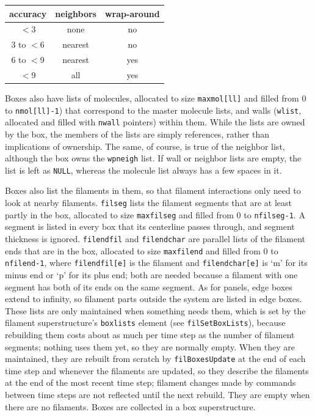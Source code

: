 \documentclass {scrbook}
\newcommand {\ttt} {\texttt}
\begin{document}
\begin{longtable}[c]{ccc}
accuracy&neighbors&wrap-around\\
\hline
$<$3&none&no\\
3 to $<$6&nearest&no\\
6 to $<$9&nearest&yes\\
$<$9&all&yes\\
\end{longtable}

Boxes also have lists of molecules, allocated to size \ttt{maxmol[ll]} and filled from 0 to \ttt{nmol[ll]-1}) that correspond to the master molecule lists, and walls (\ttt{wlist}, allocated and filled with \ttt{nwall} pointers) within them. While the lists are owned by the box, the members of the lists are simply references, rather than implications of ownership. The same, of course, is true of the neighbor list, although the box owns the \ttt{wpneigh} list. If wall or neighbor lists are empty, the list is left as \ttt{NULL}, whereas the molecule list always has a few spaces in it.

Boxes also list the filaments in them, so that filament interactions only need to look at nearby filaments. \ttt{filseg} lists the filament segments that are at least partly in the box, allocated to size \ttt{maxfilseg} and filled from 0 to \ttt{nfilseg-1}. A segment is listed in every box that its centerline passes through, and segment thickness is ignored. \ttt{filendfil} and \ttt{filendchar} are parallel lists of the filament ends that are in the box, allocated to size \ttt{maxfilend} and filled from 0 to \ttt{nfilend-1}, where \ttt{filendfil[e]} is the filament and \ttt{filendchar[e]} is `m' for its minus end or `p' for its plus end; both are needed because a filament with one segment has both of its ends on the same segment. As for panels, edge boxes extend to infinity, so filament parts outside the system are listed in edge boxes. These lists are only maintained when something needs them, which is set by the filament superstructure's \ttt{boxlists} element (see \ttt{filSetBoxLists}), because rebuilding them costs about as much per time step as the number of filament segments; nothing uses them yet, so they are normally empty. When they are maintained, they are rebuilt from scratch by \ttt{filBoxesUpdate} at the end of each time step and whenever the filaments are updated, so they describe the filaments at the end of the most recent time step; filament changes made by commands between time steps are not reflected until the next rebuild. They are empty when there are no filaments.
Boxes are collected in a box superstructure.
\end{document}
